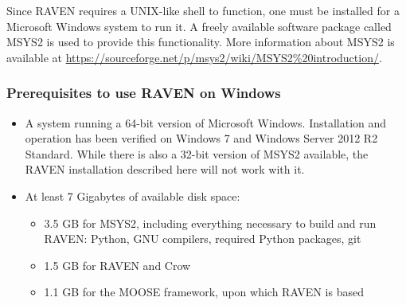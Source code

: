 Since RAVEN requires a UNIX-like shell to function, one must be installed for a Microsoft
Windows system to run it.  A freely available software package called MSYS2 is used to
provide this functionality.  More information about MSYS2 is available at
\url{https://sourceforge.net/p/msys2/wiki/MSYS2%20introduction/}.

\subsubsection{Prerequisites to use RAVEN on Windows}
\begin{itemize}
    \item A system running a 64-bit version of Microsoft Windows. Installation and operation
        has been verified on Windows 7 and Windows Server 2012 R2 Standard. While there
        is also a 32-bit version of MSYS2 available, the RAVEN installation described here will not work with it.
    \item At least 7 Gigabytes of available disk space:
    \begin{itemize}
        \item 3.5 GB for MSYS2, including everything necessary to build and run RAVEN: Python, GNU compilers, required Python packages, git
        \item 1.5 GB for RAVEN and Crow
        \item 1.1 GB for the MOOSE framework, upon which RAVEN is based
    \end{itemize}
\end{itemize}

